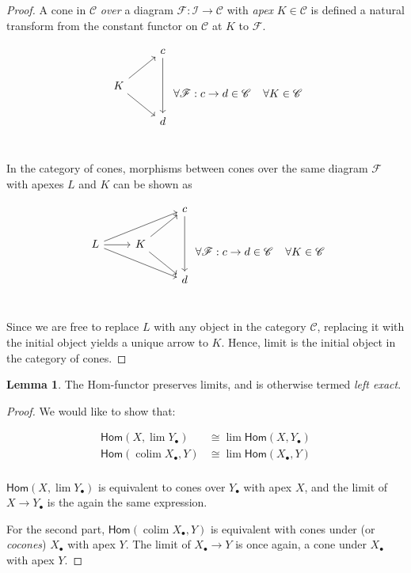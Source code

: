 \documentclass[10pt]{amsart}
\newcommand{\8}{\ensuremath{\infty}}
\newcommand{\0}{\ensuremath{\overset{\rightarrow}{0}}}
\newcommand{\1}{\ensuremath{\mathbf{1}}}
\newcommand{\C}{\ensuremath{\mathscr{C}}}
\newcommand{\F}{\ensuremath{\mathscr{F}}}
\newcommand{\I}{\ensuremath{\mathscr{I}}}
\newcommand{\Hom}{\ensuremath{\mathsf{Hom}}}
\DeclareMathOperator*{\colim}{colim}
\theoremstyle{definition}
\newtheorem{lemma}[definition]{Lemma}
\numberwithin{definition}{subsection}
\numberwithin{definition}{section}
\begin{document}
\begin{proof}
  A cone in $\C$ \emph{over} a diagram $\F : \I \rightarrow \C$ with \emph{apex} $K \in \C$ is defined a natural transform from the constant functor on $\C$ at $K$ to \F.

  \begin{equation*}
    \begin{tikzcd}
      & c \arrow[dd] \\
      K \arrow[ur] \arrow[dr] & \\
      & d \\
    \end{tikzcd} \; \forall \F : c \rightarrow d \in \C \;\;\;\; \forall K \in \C
  \end{equation*}

  In the category of cones, morphisms between cones over the same diagram $\F$ with apexes $L$ and $K$ can be shown as

  \begin{equation*}
    \begin{tikzcd}
      & & c \arrow[dd] \\
      L \arrow[r] \arrow[urr] \arrow[drr] & K \arrow[ur] \arrow[dr] & \\
      & & d \\
    \end{tikzcd} \; \forall \F : c \rightarrow d \in \C \;\;\;\; \forall K \in \C
  \end{equation*}

  Since we are free to replace $L$ with any object in the category \C, replacing it with the initial object yields a unique arrow to $K$. Hence, limit is the initial object in the category of cones.
\end{proof}

\begin{lemma}
  The Hom-functor preserves limits, and is otherwise termed \emph{left exact}.
\end{lemma}

\begin{proof}
  We would like to show that:

  \begin{align*}
    \Hom(X, \lim Y_\bullet)   & \cong \lim \Hom(X, Y_\bullet) \\
    \Hom(\colim X_\bullet, Y) & \cong \lim \Hom(X_\bullet, Y) \\
  \end{align*}

  $\Hom(X, \lim Y_\bullet)$ is equivalent to cones over $Y_\bullet$ with apex $X$, and the limit of $X \rightarrow Y_\bullet$ is the again the same expression.

  For the second part, $\Hom(\colim X_\bullet, Y)$ is equivalent with cones under (or \emph{cocones}) $X_\bullet$ with apex $Y$. The limit of $X_\bullet \rightarrow Y$ is once again, a cone under $X_\bullet$ with apex $Y$.
\end{proof}
\end{document}
